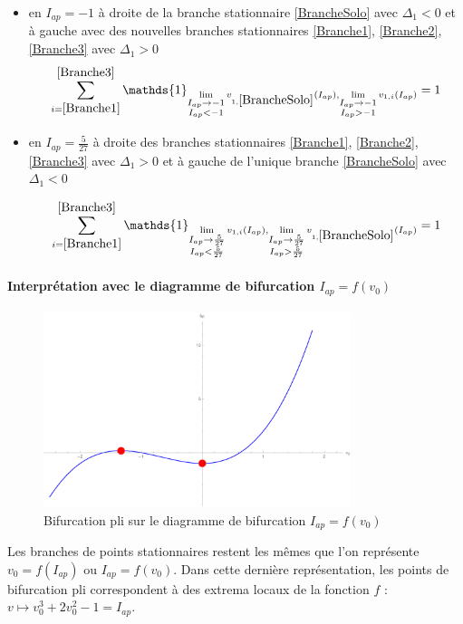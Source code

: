 \documentclass[12pt,a4paper,onecolumn]{article}
\begin{document}
\begin{itemize}
\item en $I_{ap} = -1$ à droite de la branche stationnaire \ref{BrancheSolo} avec $\Delta_1 < 0$ et à gauche avec des nouvelles branches stationnaires \ref{Branche1}, \ref{Branche2}, \ref{Branche3} avec $\Delta_1 > 0$
$$\displaystyle{\sum_{i = \ref{Branche1}}^{\ref{Branche3}}\mathds{1}_{\lim\limits_{\substack{I_{ap} \rightarrow -1 \\ I_{ap} < -1}}v_{1, \ref{BrancheSolo}}(I_{ap}), \lim\limits_{\substack{I_{ap} \rightarrow -1 \\ I_{ap} > -1}}v_{1, i}(I_{ap})}} = 1$$
\item en $I_{ap} = \frac{5}{27}$ à droite des branches stationnaires \ref{Branche1}, \ref{Branche2}, \ref{Branche3} avec $\Delta_1 > 0$ et à gauche de l'unique branche \ref{BrancheSolo} avec $\Delta_1 < 0$

$$\displaystyle{\sum_{i = \ref{Branche1}}^{\ref{Branche3}}\mathds{1}_{\lim\limits_{\substack{I_{ap} \rightarrow \frac{5}{27} \\ I_{ap} < \frac{5}{27}}}v_{1, i}(I_{ap}), \lim\limits_{\substack{I_{ap} \rightarrow \frac{5}{27} \\ I_{ap} > \frac{5}{27}}}v_{1, \ref{BrancheSolo}}(I_{ap})}} = 1$$
\end{itemize}

\paragraph{Interprétation avec le diagramme de bifurcation \texorpdfstring{$I_{ap}= f(v_0)$}{Lg}}

\begin{figure}[H]
\begin{center}
\includegraphics[origin =c, width = 0.8\textwidth]{BifurcationInv}
\end{center}
\caption{Bifurcation pli sur le diagramme de bifurcation $I_{ap}= f(v_0)$}
\end{figure}
Les branches de points stationnaires restent les mêmes que l'on représente $v_0=f(I_{ap})$ ou $I_{ap}= f(v_0)$. Dans cette dernière représentation, les points de bifurcation pli correspondent à des extrema locaux de la fonction $f$ : $v \longmapsto v_0^3 + 2v_0^2 -1 = I_{ap}$.
\end{document}

